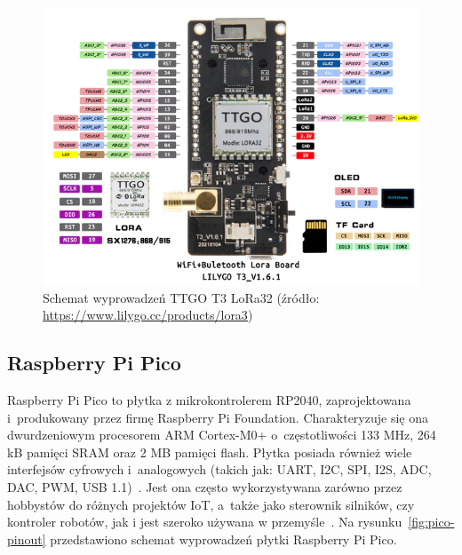 \begin{figure}[b!]
    \begin{center}
        \includegraphics[width=13cm]{pic/lora32-pinout.png}
    \end{center}
    \caption{Schemat wyprowadzeń TTGO T3 LoRa32 (źródło: \url{https://www.lilygo.cc/products/lora3})}
    \label{fig:lora32-pinout}
\end{figure}


\subsection{Raspberry Pi Pico}

Raspberry Pi Pico to płytka z mikrokontrolerem RP2040, zaprojektowana i~produkowany przez firmę Raspberry Pi Foundation.
Charakteryzuje się ona dwurdzeniowym procesorem ARM Cortex-M0+ o~częstotliwości 133 MHz, 264 kB pamięci SRAM oraz 2 MB pamięci flash.
Płytka posiada również wiele interfejsów cyfrowych i~analogowych (takich jak: UART, I2C, SPI, I2S, ADC, DAC, PWM, USB 1.1)~\cite{PICO:datasheet}.
Jest ona często wykorzystywana zarówno przez hobbystów do różnych projektów IoT, a~także jako sterownik silników, czy kontroler robotów, jak i jest szeroko używana w przemyśle~\cite{PICO:doc}. Na rysunku~\ref{fig:pico-pinout} przedstawiono schemat wyprowadzeń płytki Raspberry Pi Pico.

